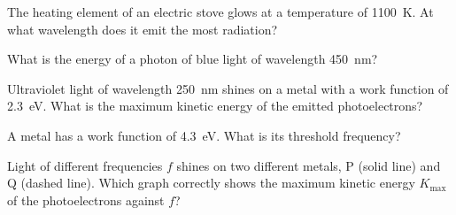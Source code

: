 \begin{quizq}{}
The heating element of an electric stove glows at a temperature of \qty{1100}{K}. At what wavelength
does it emit the most radiation?
\end{quizq}

\begin{quizq}{}
What is the energy of a photon of blue light of wavelength \qty{450}{nm}?
\end{quizq}

\begin{quizq}{}
Ultraviolet light of wavelength \qty{250}{nm} shines on a metal with a work function of \qty{2.3}{eV}.
What is the maximum kinetic energy of the emitted photoelectrons?
\end{quizq}

\begin{quizq}{}
A metal has a work function of \qty{4.3}{eV}. What is its threshold frequency?
\end{quizq}

\begin{quizq}{}
Light of different frequencies $f$ shines on two different metals, P (solid line) and Q (dashed line).
Which graph correctly shows the maximum kinetic energy $K_\mathrm{max}$ of the photoelectrons against $f$?
  {%
  }
  {%
  }
  {%
  }
\end{quizq}

